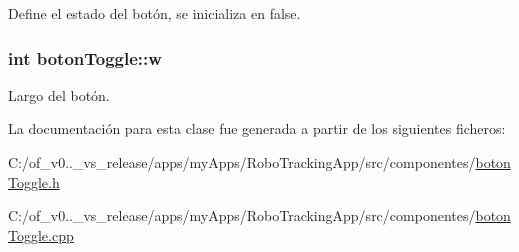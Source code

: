 Define el estado del botón, se inicializa en false. 

\hypertarget{classboton_toggle_aa76dc9adf8e8b4513bf839a061ce2129}{}
\subsubsection[{w}]{\setlength{\rightskip}{0pt plus 5cm}int boton\+Toggle\+::w\hspace{0.3cm}{\ttfamily [private]}}\label{classboton_toggle_aa76dc9adf8e8b4513bf839a061ce2129}


Largo del botón. 



La documentación para esta clase fue generada a partir de los siguientes ficheros\+:\begin{DoxyCompactItemize}
\item 
C\+:/of\+\_\+v0..\+\_\+vs\+\_\+release/apps/my\+Apps/\+Robo\+Tracking\+App/src/componentes/\hyperlink{boton_toggle_8h}{boton\+Toggle.\+h}\item 
C\+:/of\+\_\+v0..\+\_\+vs\+\_\+release/apps/my\+Apps/\+Robo\+Tracking\+App/src/componentes/\hyperlink{boton_toggle_8cpp}{boton\+Toggle.\+cpp}\end{DoxyCompactItemize}
